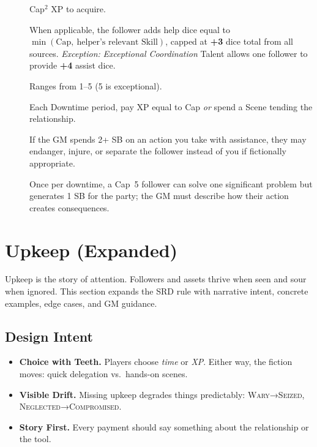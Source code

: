 \begin{description}
\item[] Cap$^{2}$ XP to acquire. 
\item[] When applicable, the follower adds help dice equal to $\min(\text{Cap},\ \text{helper's relevant Skill})$, capped at \textbf{+3} dice total from all sources. \emph{Exception:} \textit{Exceptional Coordination} Talent allows one follower to provide \textbf{+4} assist dice. 
\item[] Ranges from 1--5 (5 is exceptional). 
\item[] Each Downtime period, pay XP equal to Cap \emph{or} spend a Scene tending the relationship. 
\item[] If the GM spends 2+ SB on an action you take with assistance, they may endanger, injure, or separate the follower instead of you if fictionally appropriate. 
\item[] Once per downtime, a Cap~5 follower can solve one significant problem but generates 1 SB for the party; the GM must describe how their action creates consequences. 
\end{description}


\section{Upkeep (Expanded)}\label{sec:upkeep-expanded}

Upkeep is the story of attention. Followers and assets thrive when seen and sour when ignored. This section expands the SRD rule with narrative intent, concrete examples, edge cases, and GM guidance.

\subsection{Design Intent}\label{subsec:upkeep-intent}
\begin{itemize}
\item \textbf{Choice with Teeth.} Players choose \emph{time} or \emph{XP}. Either way, the fiction moves: quick delegation vs.\ hands-on scenes.
\item \textbf{Visible Drift.} Missing upkeep degrades things predictably: \textsc{Wary}→\textsc{Seized}, \textsc{Neglected}→\textsc{Compromised}.
\item \textbf{Story First.} Every payment should say something about the relationship or the tool.
\end{itemize}

